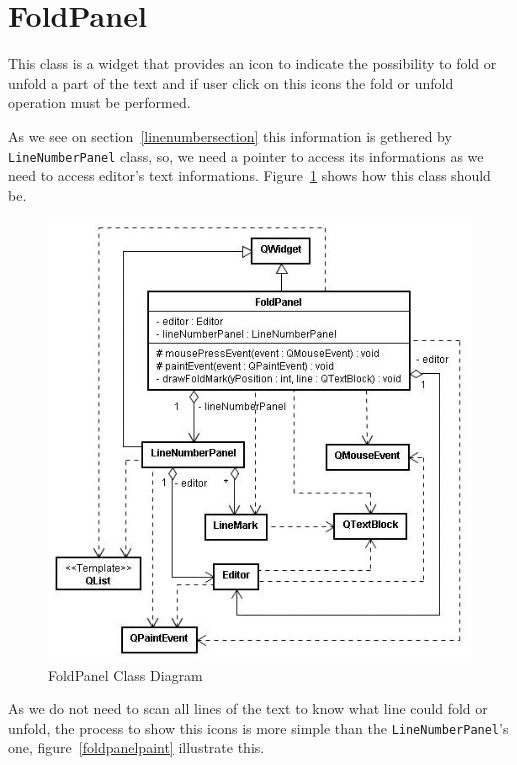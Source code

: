 \documentclass[11pt,a4paper]{report}
\begin{document}
\section{FoldPanel}
This class is a widget that provides an icon to indicate the possibility to fold or unfold a part of the text and if user click on this icons the fold or unfold operation must be performed.

As we see on section~\ref{linenumbersection} this information is gethered by \texttt{LineNumberPanel} class, so, we need a pointer to access its informations as we need to access editor's text informations. Figure~\ref{foldpanel} shows how this class should be.

\begin{figure}[hbt]
\centering
\includegraphics{images/foldpanel.jpg}
\caption{FoldPanel Class Diagram} \label{foldpanel}
\end{figure}

As we do not need to scan all lines of the text to know what line could fold or unfold, the process to show this icons is more simple than the \texttt{LineNumberPanel}'s one, figure~\ref{foldpanelpaint} illustrate this.
\end{document}
